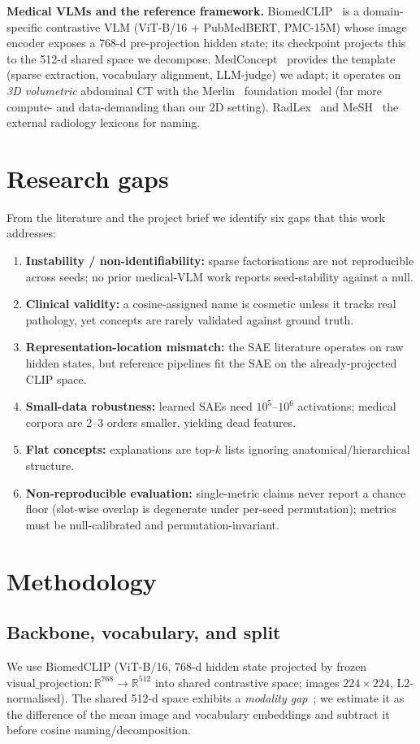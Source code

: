 \documentclass[sigconf, nonacm]{acmart}
\begin{document}
\textbf{Medical VLMs and the reference framework.} BiomedCLIP~\cite{zhang2023biomedclip} is a domain-specific contrastive VLM (ViT-B/16 + PubMedBERT, PMC-15M) whose image encoder exposes a 768-d pre-projection hidden state; its checkpoint projects this to the 512-d shared space we decompose. MedConcept~\cite{haque2026medconcept} provides the template (sparse extraction, vocabulary alignment, LLM-judge) we adapt; it operates on \emph{3D volumetric} abdominal CT with the Merlin~\cite{blankemeier2024merlin} foundation model (far more compute- and data-demanding than our 2D setting). RadLex~\cite{langlotz2006radlex} and MeSH~\cite{nlm2026mesh} the external radiology lexicons for naming.

\section{Research gaps}
From the literature and the project brief we identify six gaps that this work addresses:
\begin{enumerate}
  \item \textbf{Instability / non-identifiability:} sparse factorisations are not reproducible across seeds; no prior medical-VLM work reports seed-stability against a null.
  \item \textbf{Clinical validity:} a cosine-assigned name is cosmetic unless it tracks real pathology, yet concepts are rarely validated against ground truth.
  \item \textbf{Representation-location mismatch:} the SAE literature operates on raw hidden states, but reference pipelines fit the SAE on the already-projected CLIP space.
  \item \textbf{Small-data robustness:} learned SAEs need $10^5$--$10^6$ activations; medical corpora are 2--3 orders smaller, yielding dead features.
  \item \textbf{Flat concepts:} explanations are top-$k$ lists ignoring anatomical/hierarchical structure.
  \item \textbf{Non-reproducible evaluation:} single-metric claims never report a chance floor (slot-wise overlap is degenerate under per-seed permutation); metrics must be null-calibrated and permutation-invariant.
\end{enumerate}

\section{Methodology}
\subsection{Backbone, vocabulary, and split}
We use BiomedCLIP (ViT-B/16, 768-d hidden state projected by frozen $\mathrm{visual\_projection}: \mathbb{R}^{768}\!\to\!\mathbb{R}^{512}$ into shared contrastive space; images $224{\times}224$, L2-normalised). The shared 512-d space exhibits a \emph{modality gap}~\cite{liang2022mindthegap}; we estimate it as the difference of the mean image and vocabulary embeddings and subtract it before cosine naming/decomposition.
\end{document}

